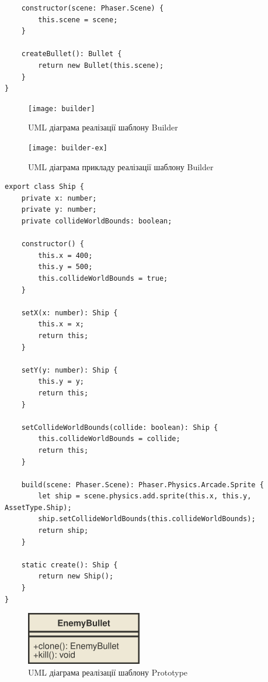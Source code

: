 \documentclass[oneside,14pt]{extarticle}
\begin{document}
\begin{normalsize}
\begin{small}
\begin{lstlisting}
	constructor(scene: Phaser.Scene) {
		this.scene = scene;
	}
	
	createBullet(): Bullet {
		return new Bullet(this.scene);
	}
}
		\end{lstlisting}
	\end{small}
	
	\begin{figure}[H]
		\centering
		\texttt{[image: builder]}
		\caption{UML діаграма реалізації шаблону Builder}
	\end{figure}
	
	\begin{figure}[H]
		\centering
		\texttt{[image: builder-ex]}
		\caption{UML діаграма прикладу реалізації шаблону Builder}
	\end{figure}
	
	\begin{small}
		\begin{lstlisting}
export class Ship {
	private x: number;
	private y: number;
	private collideWorldBounds: boolean;
	
	constructor() {
		this.x = 400;
		this.y = 500;
		this.collideWorldBounds = true;
	}
	
	setX(x: number): Ship {
		this.x = x;
		return this;
	}
	
	setY(y: number): Ship {
		this.y = y;
		return this;
	}
	
	setCollideWorldBounds(collide: boolean): Ship {
		this.collideWorldBounds = collide;
		return this;
	}
	
	build(scene: Phaser.Scene): Phaser.Physics.Arcade.Sprite {
		let ship = scene.physics.add.sprite(this.x, this.y, AssetType.Ship);
		ship.setCollideWorldBounds(this.collideWorldBounds);
		return ship;
	}
	
	static create(): Ship {
		return new Ship();
	}
}
		\end{lstlisting}
	\end{small}
	
	\begin{figure}[H]
		\centering
		\includegraphics{prototype}
		\caption{UML діаграма реалізації шаблону Prototype}
	\end{figure}
	

\end{normalsize}
\end{document}
